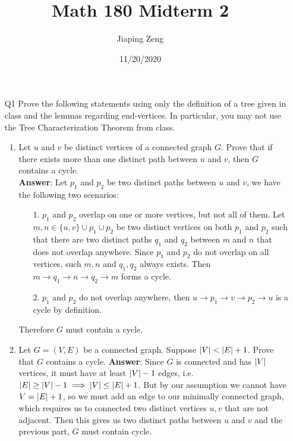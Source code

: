 \documentclass{article}
\title{Math 180 Midterm 2}
\author{Jiaping Zeng}
\date{11/20/2020}
\begin{document}

\newpage
\begin{itemize}
      \item [Q1]
            Prove the following statements using only the definition of a tree given in class and the lemmas regarding end-vertices. In particular, you may not use the Tree Characterization Theorem from class.
            \begin{enumerate}
                  \item Let $u$ and $v$ be distinct vertices of a connected graph $G$. Prove that if there exists more than one distinct path between $u$ and $v$, then $G$ contains a cycle.\\
                        \textbf{Answer}: Let $p_1$ and $p_2$ be two distinct paths between $u$ and $v$, we have the following two scenarios:
                        \begin{itemize}
                              \item [1.] $p_1$ and $p_2$ overlap on one or more vertices, but not all of them. Let $m,n\in \{u,v\}\cup p_1\cup p_2$ be two distinct vertices on both $p_1$ and $p_2$ such that there are two distinct paths $q_1$ and $q_2$ between $m$ and $n$ that does not overlap anywhere. Since $p_1$ and $p_2$ do not overlap on all vertices, such $m,n$ and $q_1,q_2$ always exists. Then $m\rightarrow q_1\rightarrow n\rightarrow q_2\rightarrow m$ forms a cycle.
                              \item [2.] $p_1$ and $p_2$ do not overlap anywhere, then $u\rightarrow p_1\rightarrow v\rightarrow p_2\rightarrow u$ is a cycle by definition.
                        \end{itemize}
                        Therefore $G$ must contain a cycle.
                  \item Let $G=(V,E)$ be a connected graph. Suppose $\abs{V}<\abs{E}+1$. Prove that $G$ contains a cycle.
                        \textbf{Answer}: Since $G$ is connected and has $\abs{V}$ vertices, it must have at least $\abs{V}-1$ edges, i.e. $\abs{E}\geq\abs{V}-1\implies\abs{V}\leq\abs{E}+1$. But by our assumption we cannot have $V=\abs{E}+1$, so we must add an edge to our minimally connected graph, which requires us to connected two distinct vertices $u,v$ that are not adjacent. Then this gives us two distinct paths between $u$ and $v$ and the previous part, $G$ must contain cycle.
            \end{enumerate}
\end{itemize}
\end{document}
